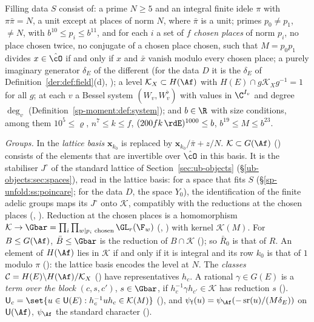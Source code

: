 \begin{definition}\label{sp-unfold:def:filling}
Filling data $S$ consist of: a prime $N\ge5$ and an integral finite idele $\pi$ with $\pi\bar\pi=N$,
a unit except at places of norm $N$, where $\bar\pi$ is a unit; primes $p_0\ne p_1$, $\ne N$, with
$b^{10}\le p_i\le b^{11}$, and for each $i$ a set of $f$ \emph{chosen places} of norm $p_i$, no
place chosen twice, no conjugate of a chosen place chosen, such that $M=p_0p_1$ divides
$x\in\hat\cO$ if and only if $x$ and $\bar x$ vanish modulo every chosen place; a purely imaginary
generator $\delta_E$ of the different (for the data $D$ it is the $\delta_E$ of
Definition~\ref{der:def:field}(d), ); a level $\mathcal K_X\subset H(\Af)$ with $H(E)\cap g\mathcal K_Xg^{-1}=1$ for
all $g$; at each $v$ a Bessel system $(W_v,W_v^\flat)$ with values in $\C^{I_v}$ and degree
$\deg_v$ (Definition~\ref{sp-moment:def:system}); and $b\in\R$ with size conditions, among them
$10^5\le\varrho$, $n^7\le k\le f$, $(200fk\,\rdE)^{1000}\le b$, $b^{19}\le M\le b^{23}$.
\end{definition}

\emph{Groups.} In the \emph{lattice basis} $\mathbf x_{k_0}$ is replaced by $\mathbf x_{k_0}/\bar\pi+z/N$.
$\mathcal K\subset G(\Af)$ () consists of the elements that are
invertible over $\hat\cO$ in this basis. It is the stabiliser $J^\circ$ of the standard lattice of
Section~\ref{sec:ub-objects} (\S\ref{ub-objects:sec:spaces}), read in the lattice basis: for a space
that fits $S$ (\S\ref{sp-unfold:ss:poincare}; for the data $D$, the space $Y_0$), the identification of
the finite adelic groups maps its $J^\circ$ onto $\mathcal K$, compatibly with the reductions at the
chosen places (,
). Reduction at the chosen places is a homomorphism
$\mathcal K\to\Gbar=\prod_i\prod_{w\mid p_i\text{ chosen}}\GL_r(\F_w)$ (,
) with kernel $\mathcal K(M)$. For $B\le G(\Af)$, $\bar B\le\Gbar$ is the
reduction of $B\cap\mathcal K$ (); so $\bar R_0$ is that of $R$. An element of
$H(\Af)$ lies in $\mathcal K$ if and only if it is integral and its row $k_0$ is that of $1$ modulo $\pi$
(): the lattice basis encodes the level at $N$.
The \emph{classes} $\mathcal C=H(E)\backslash H(\Af)/\mathcal K_X$ () have
representatives $h_c$. A rational $\gamma\in G(E)$ is a \emph{term over the block} $(c,s,c')$,
$s\in\Gbar$, if $h_c^{-1}\gamma h_{c'}\in\mathcal K$ has reduction $s$ ().
$\mathsf U_c=\set{u\in\mathsf U(E):h_c^{-1}uh_c\in\mathcal K(M)}$ (), and
$\psi_{\mathrm f}(u)=\psi_{\Af}(-\operatorname{sr}(u)/(M\delta_E))$ on $\mathsf U(\Af)$, $\psi_{\Af}$ the standard character
().

